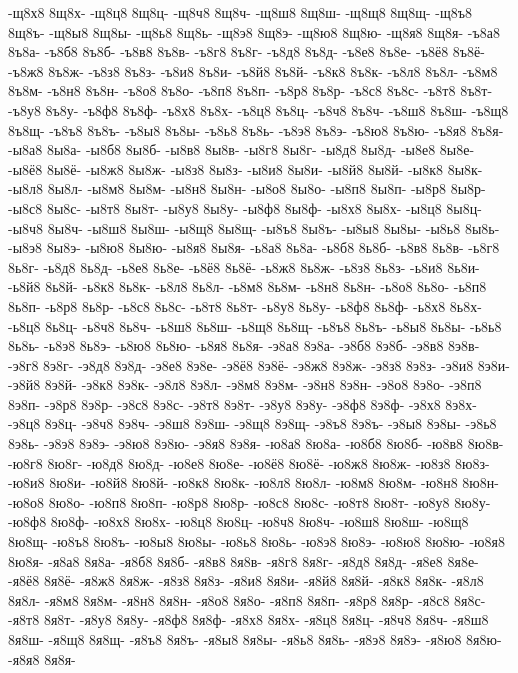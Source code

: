 {-щ8х8
8щ8х-
-щ8ц8
8щ8ц-
-щ8ч8
8щ8ч-
-щ8ш8
8щ8ш-
-щ8щ8
8щ8щ-
-щ8ъ8
8щ8ъ-
-щ8ы8
8щ8ы-
-щ8ь8
8щ8ь-
-щ8э8
8щ8э-
-щ8ю8
8щ8ю-
-щ8я8
8щ8я-
-ъ8а8
8ъ8а-
-ъ8б8
8ъ8б-
-ъ8в8
8ъ8в-
-ъ8г8
8ъ8г-
-ъ8д8
8ъ8д-
-ъ8е8
8ъ8е-
-ъ8ё8
8ъ8ё-
-ъ8ж8
8ъ8ж-
-ъ8з8
8ъ8з-
-ъ8и8
8ъ8и-
-ъ8й8
8ъ8й-
-ъ8к8
8ъ8к-
-ъ8л8
8ъ8л-
-ъ8м8
8ъ8м-
-ъ8н8
8ъ8н-
-ъ8о8
8ъ8о-
-ъ8п8
8ъ8п-
-ъ8р8
8ъ8р-
-ъ8с8
8ъ8с-
-ъ8т8
8ъ8т-
-ъ8у8
8ъ8у-
-ъ8ф8
8ъ8ф-
-ъ8х8
8ъ8х-
-ъ8ц8
8ъ8ц-
-ъ8ч8
8ъ8ч-
-ъ8ш8
8ъ8ш-
-ъ8щ8
8ъ8щ-
-ъ8ъ8
8ъ8ъ-
-ъ8ы8
8ъ8ы-
-ъ8ь8
8ъ8ь-
-ъ8э8
8ъ8э-
-ъ8ю8
8ъ8ю-
-ъ8я8
8ъ8я-
-ы8а8
8ы8а-
-ы8б8
8ы8б-
-ы8в8
8ы8в-
-ы8г8
8ы8г-
-ы8д8
8ы8д-
-ы8е8
8ы8е-
-ы8ё8
8ы8ё-
-ы8ж8
8ы8ж-
-ы8з8
8ы8з-
-ы8и8
8ы8и-
-ы8й8
8ы8й-
-ы8к8
8ы8к-
-ы8л8
8ы8л-
-ы8м8
8ы8м-
-ы8н8
8ы8н-
-ы8о8
8ы8о-
-ы8п8
8ы8п-
-ы8р8
8ы8р-
-ы8с8
8ы8с-
-ы8т8
8ы8т-
-ы8у8
8ы8у-
-ы8ф8
8ы8ф-
-ы8х8
8ы8х-
-ы8ц8
8ы8ц-
-ы8ч8
8ы8ч-
-ы8ш8
8ы8ш-
-ы8щ8
8ы8щ-
-ы8ъ8
8ы8ъ-
-ы8ы8
8ы8ы-
-ы8ь8
8ы8ь-
-ы8э8
8ы8э-
-ы8ю8
8ы8ю-
-ы8я8
8ы8я-
-ь8а8
8ь8а-
-ь8б8
8ь8б-
-ь8в8
8ь8в-
-ь8г8
8ь8г-
-ь8д8
8ь8д-
-ь8е8
8ь8е-
-ь8ё8
8ь8ё-
-ь8ж8
8ь8ж-
-ь8з8
8ь8з-
-ь8и8
8ь8и-
-ь8й8
8ь8й-
-ь8к8
8ь8к-
-ь8л8
8ь8л-
-ь8м8
8ь8м-
-ь8н8
8ь8н-
-ь8о8
8ь8о-
-ь8п8
8ь8п-
-ь8р8
8ь8р-
-ь8с8
8ь8с-
-ь8т8
8ь8т-
-ь8у8
8ь8у-
-ь8ф8
8ь8ф-
-ь8х8
8ь8х-
-ь8ц8
8ь8ц-
-ь8ч8
8ь8ч-
-ь8ш8
8ь8ш-
-ь8щ8
8ь8щ-
-ь8ъ8
8ь8ъ-
-ь8ы8
8ь8ы-
-ь8ь8
8ь8ь-
-ь8э8
8ь8э-
-ь8ю8
8ь8ю-
-ь8я8
8ь8я-
-э8а8
8э8а-
-э8б8
8э8б-
-э8в8
8э8в-
-э8г8
8э8г-
-э8д8
8э8д-
-э8е8
8э8е-
-э8ё8
8э8ё-
-э8ж8
8э8ж-
-э8з8
8э8з-
-э8и8
8э8и-
-э8й8
8э8й-
-э8к8
8э8к-
-э8л8
8э8л-
-э8м8
8э8м-
-э8н8
8э8н-
-э8о8
8э8о-
-э8п8
8э8п-
-э8р8
8э8р-
-э8с8
8э8с-
-э8т8
8э8т-
-э8у8
8э8у-
-э8ф8
8э8ф-
-э8х8
8э8х-
-э8ц8
8э8ц-
-э8ч8
8э8ч-
-э8ш8
8э8ш-
-э8щ8
8э8щ-
-э8ъ8
8э8ъ-
-э8ы8
8э8ы-
-э8ь8
8э8ь-
-э8э8
8э8э-
-э8ю8
8э8ю-
-э8я8
8э8я-
-ю8а8
8ю8а-
-ю8б8
8ю8б-
-ю8в8
8ю8в-
-ю8г8
8ю8г-
-ю8д8
8ю8д-
-ю8е8
8ю8е-
-ю8ё8
8ю8ё-
-ю8ж8
8ю8ж-
-ю8з8
8ю8з-
-ю8и8
8ю8и-
-ю8й8
8ю8й-
-ю8к8
8ю8к-
-ю8л8
8ю8л-
-ю8м8
8ю8м-
-ю8н8
8ю8н-
-ю8о8
8ю8о-
-ю8п8
8ю8п-
-ю8р8
8ю8р-
-ю8с8
8ю8с-
-ю8т8
8ю8т-
-ю8у8
8ю8у-
-ю8ф8
8ю8ф-
-ю8х8
8ю8х-
-ю8ц8
8ю8ц-
-ю8ч8
8ю8ч-
-ю8ш8
8ю8ш-
-ю8щ8
8ю8щ-
-ю8ъ8
8ю8ъ-
-ю8ы8
8ю8ы-
-ю8ь8
8ю8ь-
-ю8э8
8ю8э-
-ю8ю8
8ю8ю-
-ю8я8
8ю8я-
-я8а8
8я8а-
-я8б8
8я8б-
-я8в8
8я8в-
-я8г8
8я8г-
-я8д8
8я8д-
-я8е8
8я8е-
-я8ё8
8я8ё-
-я8ж8
8я8ж-
-я8з8
8я8з-
-я8и8
8я8и-
-я8й8
8я8й-
-я8к8
8я8к-
-я8л8
8я8л-
-я8м8
8я8м-
-я8н8
8я8н-
-я8о8
8я8о-
-я8п8
8я8п-
-я8р8
8я8р-
-я8с8
8я8с-
-я8т8
8я8т-
-я8у8
8я8у-
-я8ф8
8я8ф-
-я8х8
8я8х-
-я8ц8
8я8ц-
-я8ч8
8я8ч-
-я8ш8
8я8ш-
-я8щ8
8я8щ-
-я8ъ8
8я8ъ-
-я8ы8
8я8ы-
-я8ь8
8я8ь-
-я8э8
8я8э-
-я8ю8
8я8ю-
-я8я8
8я8я-
}
